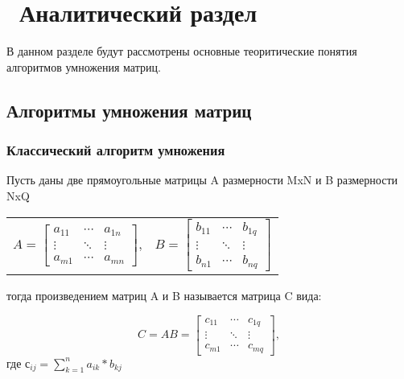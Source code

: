 \chapter{ Аналитический раздел}
\label{cha:analytical}
    В данном разделе будут рассмотрены основные теоритические понятия алгоритмов умножения матриц.

    \section{Алгоритмы умножения матриц}
        \subsection{Классический алгоритм умножения}
    
        Пусть даны две прямоугольные матрицы A размерности MxN и B размерности NxQ
        
        \begin{table}[]
            \centering
            \begin{tabular}{cc}
                $ A = \begin{bmatrix}
                        a_{11} & \cdots  & a_{1n} \\ 
                        \vdots & \ddots  & \vdots \\ 
                        a_{m1} & \cdots  & a_{mn}
                    \end{bmatrix} $, 
                &  
                $ B = \begin{bmatrix}
                        b_{11} & \cdots  & b_{1q} \\ 
                        \vdots & \ddots  & \vdots \\ 
                        b_{n1} & \cdots  & b_{nq}
                    \end{bmatrix} $
            \end{tabular}
        \end{table}

        тогда произведением матриц A и B называется матрица C вида:

        \begin{equation}
            C = AB = \begin{bmatrix}
                        c_{11} & \cdots  & c_{1q} \\ 
                        \vdots & \ddots  & \vdots \\ 
                        c_{m1} & \cdots  & c_{mq}
                    \end{bmatrix},
        \end{equation} 
        где $с_{ij} = \sum _{k=1}^{n} a_{ik} * b_{kj}$

